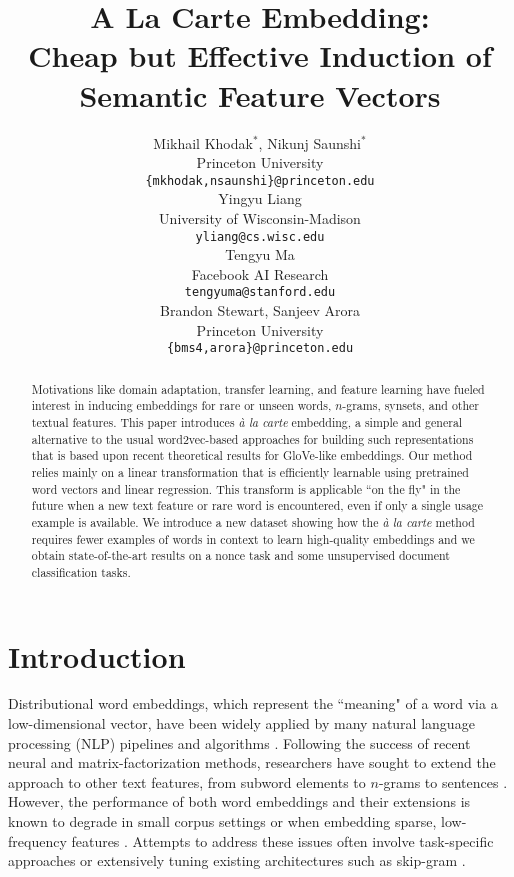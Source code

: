 \documentclass[11pt,a4paper]{article}
\title{A La Carte Embedding:\\Cheap but Effective Induction of Semantic Feature Vectors\vspace{0.5cm}}
\author{
	Mikhail Khodak$^\ast$, Nikunj Saunshi$^\ast$ \\
	Princeton University \\
	\texttt{\{mkhodak,nsaunshi\}@princeton.edu} \\
	\And
	\qquad Yingyu Liang \\
	\qquad University of Wisconsin-Madison \\
	\qquad \texttt{yliang@cs.wisc.edu} \\
	\AND
	Tengyu Ma \\
	Facebook AI Research \\
	\texttt{tengyuma@stanford.edu}
	\\\And
	\qquad Brandon Stewart, Sanjeev Arora \\
	\qquad Princeton University \\
	\qquad \texttt{\{bms4,arora\}@princeton.edu}
}
\date{}
\begin{document}
\maketitle

\begin{abstract}
	Motivations like domain adaptation, transfer learning, and feature learning have fueled interest in inducing embeddings for rare or unseen words, $n$-grams, synsets, and other textual features.
	This paper introduces {\em\` a la carte} embedding, a simple and general alternative to the usual word2vec-based approaches for building such representations that is based upon recent theoretical results for GloVe-like embeddings.
	Our method relies mainly on a linear transformation that is efficiently learnable using pretrained word vectors and linear regression.
	This transform is applicable ``on the fly" in the future when a new text feature or rare word is encountered, even if only a single usage example is available. 
	We introduce a new dataset showing how the {\em\` a la carte} method requires fewer examples of words in context to learn high-quality embeddings and we obtain state-of-the-art results on a nonce task and some unsupervised document classification tasks.
\end{abstract}



\section{Introduction}\label{sec:intro}

Distributional word embeddings, which represent the ``meaning" of a word via a low-dimensional vector, have been widely applied by many natural language processing (NLP) pipelines and algorithms \cite{Goldberg:16}.
Following the success of recent neural \cite{Mikolov:13} and matrix-factorization \cite{Pennington:14} methods, researchers have sought to extend the approach to other text features, from subword elements to $n$-grams to sentences \cite{Bojanowski:16,Poliak:17,Kiros:15}.
However, the performance of both word embeddings and their extensions is known to degrade in small corpus settings \cite{Adams:17} or when embedding sparse, low-frequency features \cite{Lazaridou:17}.
Attempts to address these issues often involve task-specific approaches \cite{Rothe:15,Iacobacci:15,Pagliardini:18} or extensively tuning existing architectures such as skip-gram \cite{Poliak:17,Herbelot:17}.
\end{document}
